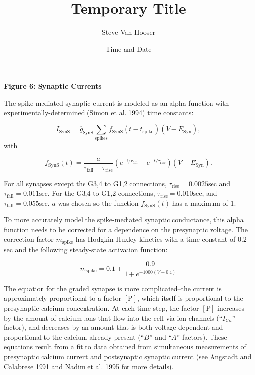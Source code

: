 
\setlength{\headheight}{0in}
\setlength{\topmargin}{0in}
\setlength{\textheight}{8.5in}

\title{Temporary Title}
\author{Steve Van Hooser}
\date{Time and Date}




{\bf Figure 6:  Synaptic Currents}

The spike-mediated synaptic current is modeled as an alpha function with
experimentally-determined (Simon et al. 1994) time constants:

\begin{displaymath}I_{\mathrm{SynS}} = \overline{g}_{\mathrm{SynS}} {\sum_{\mathrm{spikes}}}{f_{\mathrm{SynS}}(t-t_{\mathrm{spike}}) (V-E_{\mathrm{Syn}}),}\end{displaymath} with

\begin{displaymath}f_{\mathrm{SynS}}(t) = \frac{a}{\tau_{\mathrm{fall}}-\tau_{\mathrm{rise}}}(e^{-t/\tau_{\mathrm{fall}}}-e^{-t/\tau_{\mathrm{rise}}})(V-E_{\mathrm{Syn}}).\end{displaymath}

For all synapses except the G3,4 to G1,2 connections, $\tau_{\mathrm{rise}} = 0.0025\mathrm{sec}$ and $\tau_{\mathrm{fall}} = 0.011\mathrm{sec}$.  For the G3,4 to G1,2
connections, $\tau_{\mathrm{rise}} = 0.010\mathrm{sec}$, and $\tau_{\mathrm{fall}} = 0.055\mathrm{sec}$. $a$ was chosen so the function $f_{\mathrm{SynS}}(t)$ has a maximum of 1.  

To more accurately model the spike-mediated synaptic conductance, this alpha function
needs to be corrected for a dependence on the presynaptic voltage.  The correction factor $m_{\mathrm{spike}}$ has Hodgkin-Huxley kinetics with a time constant of 0.2 sec
and the following steady-state activation function: 

\begin{displaymath}m_{\mathrm{spike}} = 0.1 + \frac{0.9}{1+e^{-1000(V+0.4)}}
\end{displaymath}



The equation 
for the graded synapse is more complicated--the current is approximately proportional to a factor $[\mathrm{P}]$, which itself is proportional to the 
presynaptic calcium concentration.  At each time step, the factor $[\mathrm{P}]$ increases by the amount of calcium ions that flow into the cell via ion 
channels (``$I_{Ca}$'' factor), and decreases by an amount that is both voltage-dependent and proportional to the calcium already present
(``$B$''
and ``$A$'' factors).  These equations result from a fit to data obtained from simultaneous measurements of presynaptic calcium current and 
postsynaptic synaptic current (see Angstadt and Calabrese 1991 and Nadim et al. 1995 for more details).

